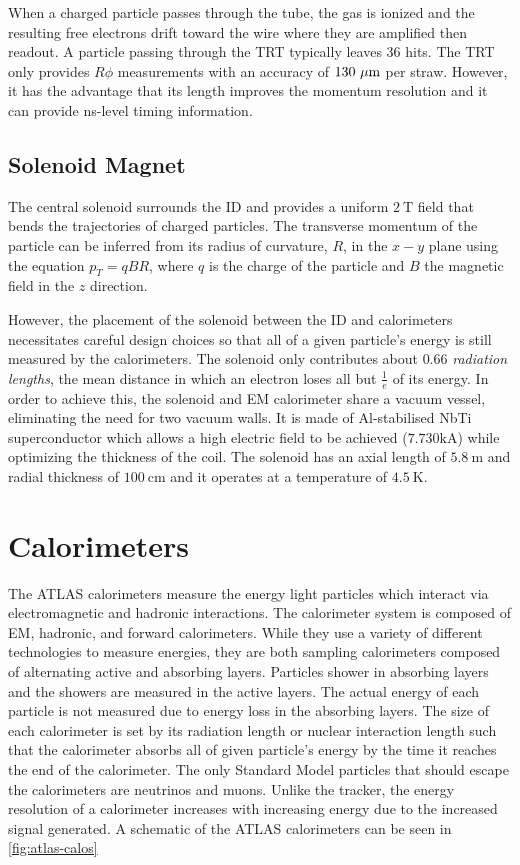 When a charged particle passes through the tube, the gas is ionized and the resulting free electrons drift toward the wire where they are amplified then readout. A particle passing through the \ac{TRT} typically leaves 36 hits. The \ac{TRT} only provides $R\phi$ measurements with an accuracy of $130~\mu\text{m}$ per straw. However, it has the advantage that its length improves the momentum resolution and it  can provide ns-level timing information.


\subsection{Solenoid Magnet}

The central solenoid surrounds the \ac{ID} and provides a uniform $2~\textrm{T}$ field that bends the trajectories of charged particles. The transverse momentum of the particle can be inferred from its radius of curvature, $R$, in the $x-y$ plane using the equation $p_{T} = qBR$, where $q$ is the charge of the particle and $B$ the magnetic field in the $z$ direction.

However, the placement of the solenoid between the \ac{ID} and calorimeters necessitates careful design choices so that all of a given particle's energy is still measured by the calorimeters. The solenoid only contributes about $0.66$ \emph{radiation lengths}, the mean distance in which an electron loses all but $\frac{1}{e}$ of its energy. In order to achieve this, the solenoid and \ac{EM} calorimeter share a vacuum vessel, eliminating the need for two vacuum walls. It is made of Al-stabilised NbTi superconductor which allows a high electric field to be achieved ($7.730 \textrm{kA}$) while optimizing the thickness of the coil. The solenoid has an axial length of $5.8~\textrm{m}$ and radial thickness of $100~ \textrm{cm}$ and it operates at a temperature of $4.5~\textrm{K}$. 


\section{Calorimeters}

The \ac{ATLAS} calorimeters measure the energy light particles which interact via electromagnetic and hadronic interactions. The calorimeter system is composed of \ac{EM}, hadronic, and forward calorimeters. While they use a variety of different technologies to measure energies, they are both sampling calorimeters composed of alternating active and absorbing layers. Particles shower in absorbing layers and the showers are measured in the active layers. The actual energy of each particle is not measured due to energy loss in the absorbing layers. The size of each calorimeter is set by its radiation length or nuclear interaction length such that the calorimeter absorbs all of given particle's energy by the time it reaches the end of the calorimeter. The only Standard Model particles that should escape the calorimeters are neutrinos and muons. Unlike the tracker, the energy resolution of a calorimeter increases with increasing energy due to the increased signal generated.  A schematic of the \ac{ATLAS} calorimeters can be seen in \autoref{fig:atlas-calos}


